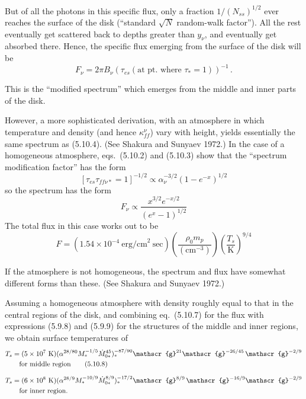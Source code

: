 But of all the photons in this specific flux, only a fraction $1/(N_{ss})^{1/2}$ ever
reaches the surface of the disk (``standard $\sqrt{N}$ random-walk factor'').  All the
rest eventually get scattered back to depths greater than $y_\nu$, and eventually get
absorbed there.  Hence, the specific flux emerging from the surface of the disk
will be
%
\begin{equation}
\tag{5.10.4}
F_\nu = 2\pi B_\nu (\tau_{es}(\text{at pt.\ where } \tau_{*} = 1))^{-1}\,.
\end{equation}

This is the ``modified spectrum'' which emerges from the middle and inner parts
of the disk.

However, a more sophisticated derivation, with an atmosphere in which tempera\-ture
and density (and hence $\kappa_{ff}^{\nu}$) vary with height, yields essentially the same
spectrum as (5.10.4).  (See Shakura and Sunyaev 1972.)  In the case of a homo\-geneous
atmosphere, eqs.\ (5.10.2) and (5.10.3) show that the ``spectrum
modification factor'' has the form
%
\begin{equation}
\tag{5.10.5}
[\tau_{es}\tau_{ff\nu*} = 1]^{-1/2}
\propto \alpha_\nu^{-3/2}(1 - e^{-x})^{1/2}
\end{equation}
%
so the spectrum has the form
%
\[
F_\nu \propto \frac{x^{3/2} e^{-x/2}}{(e^x - 1)^{1/2}}
\]
%
The total flux in this case works out to be
%
\begin{equation}
\tag{5.10.6}
F = (1.54 \times 10^{-4}~\text{erg/cm}^2~\text{sec})
\left(\frac{\rho_0 m_p}{(\text{cm}^{-3})}\right)
\left(\frac{T_s}{\text{K}}\right)^{9/4}
\end{equation}

If the atmosphere is not homogeneous, the spectrum and flux have somewhat
different forms than these.  (See Shakura and Sunyaev 1972.)

Assuming a homogeneous atmosphere with density roughly equal to that in
the central regions of the disk, and combining eq.\ (5.10.7) for the flux with
expressions (5.9.8) and (5.9.9) for the structures of the middle and inner regions,
we obtain surface temperatures of
%
\begin{align}
T_s &= (5 \times 10^7~\text{K})(\alpha^{28/80}M_*^{-1/5}\dot{M}_{0*}^{45})_*^{-87/90}\mathscr{g}^{21}\mathscr{g}^{-26/45}\,\mathscr{g}^{-2/9}
\notag\\
&\quad \text{for middle region}
\tag{5.10.8}\\[6pt]
T_s &= (6 \times 10^8~\text{K})(\alpha^{28/9}M_*^{-10/9}\dot{M}_{0*}^{8/9})_*^{-17/2}\mathscr{g}^{8/9}\,\mathscr{g}^{-16/9}\mathscr{g}^{-2/9}
\notag\\
&\quad \text{for inner region.}
\notag
\end{align}

